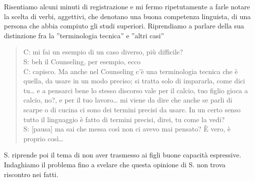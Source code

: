 \noindent Risentiamo alcuni minuti di registrazione e mi fermo ripetutamente a farle notare la scelta di verbi, aggettivi, che denotano una buona competenza linguista, di una persona che abbia compiuto gli studi superiori. Riprendiamo a parlare della sua distinzione fra la ''terminologia tecnica'' e ''altri casi''

\begin{verse}
C: mi fai un esempio di un caso diverso, più difficile?\\
S: beh il Counseling, per esempio, ecco\\
C: capisco. Ma anche nel Counseling c'è una terminologia tecnica che è quella, da usare in un modo preciso; si tratta solo di impararla, come dici tu\ldots{}   e a pensarci bene lo stesso discorso vale per il calcio, tuo figlio gioca a calcio, no?, e per il tuo lavoro\ldots{}   mi viene da dire che anche se parli di scarpe o di cucina ci sono dei termini precisi da usare. In un certo senso tutto il linguaggio è fatto di termini precisi, direi, tu come la vedi?\\
S: [pausa] ma sai che messa così non ci avevo mai pensato? \`{E} vero, è proprio così\ldots{}  
\end{verse}

\noindent S. riprende poi il tema di non aver trasmesso ai figli buone capacità espressive. Indaghiamo il problema fino a svelare che questa opinione di S. non trova riscontro nei fatti.

